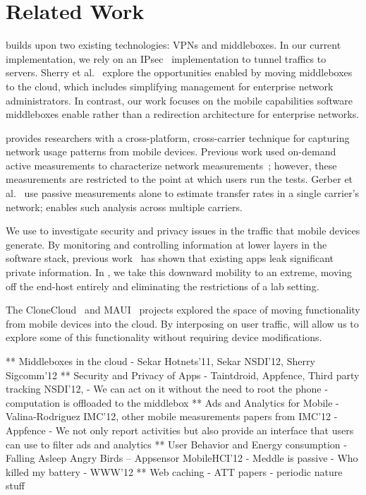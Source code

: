\section{Related Work}
\meddle builds upon two existing technologies: VPNs and middleboxes. 
In our current implementation, we rely on an IPsec~\cite{rfc:ipsec} implementation 
to tunnel traffics to \meddle servers. Sherry et al.~\cite{sherry:middleboxes} explore the opportunities 
enabled by moving middleboxes to the cloud, which includes simplifying management 
for enterprise network administrators. In contrast, our work focuses on the mobile capabilities 
software middleboxes enable rather than a redirection architecture for enterprise networks. 

\meddle provides researchers with a cross-platform, cross-carrier technique 
for capturing network usage patterns from mobile devices. Previous work 
used on-demand active measurements to characterize network measurements~\cite{wang:middleboxes,speedtest}; 
however, these measurements are restricted to the point at which users run 
the tests. Gerber et al.~\cite{gerber:passivespeed} use passive measurements alone 
to estimate transfer rates in a single carrier's network; \meddle 
enables such analysis across multiple carriers.

We use \meddle to investigate security and privacy issues in the 
traffic that mobile devices generate. By monitoring and controlling 
information at lower layers in the software stack, previous work~\cite{enck:taintdroid,hornyack:appfence,wsj:apps-watching-you} has shown 
that existing apps leak significant private information. In \meddle, we take 
this downward mobility to an extreme, moving off the end-host entirely and 
eliminating the restrictions of a lab setting.

The CloneCloud~\cite{chun:clonecloud} and MAUI~\cite{cuervo:maui} projects explored the space of moving functionality 
from mobile devices into the cloud. By interposing on user traffic, \meddle will allow us to explore some of this 
functionality without requiring device modifications.


** Middleboxes in the cloud
 - Sekar Hotnets'11, Sekar NSDI'12, Sherry Sigcomm'12
** Security and Privacy of Apps
  - Taintdroid, Appfence, Third party tracking NSDI'12, 
  - We can act on it without the need to root the phone - computation is offloaded to the middlebox
** Ads and Analytics for Mobile
  - Valina-Rodriguez IMC'12, other mobile measurements papers from IMC'12
  - Appfence
  - We not only report activities but also provide an interface that users can use to filter ads and analytics
** User Behavior and Energy consumption
  - Falling Asleep Angry Birds -- Appsensor MobileHCI'12 
     - Meddle is passive
  - Who killed my battery - WWW'12 
** Web caching 
  - ATT papers - periodic nature stuff